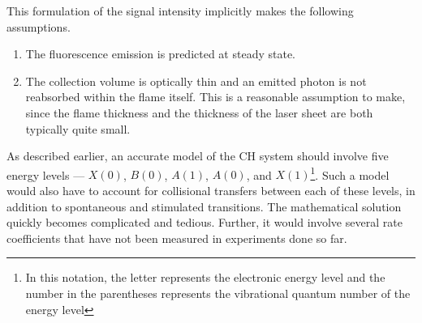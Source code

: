 This formulation of the signal intensity implicitly makes the following assumptions.
\begin{enumerate}
\item The fluorescence emission is predicted at steady state.
\item The collection volume is optically thin and an emitted photon is not reabsorbed within the flame itself.
This is a reasonable assumption to make, since the flame thickness and the thickness of the laser sheet are both typically quite small.
\end{enumerate}

As described earlier, an accurate model of the CH system should involve five energy levels --- \(X(0)\), \(B(0)\), \(A(1)\), \(A(0)\), and \(X(1)\)\footnote{In this notation, the letter represents the electronic energy level and the number in the parentheses represents the vibrational quantum number of the energy level}.
Such a model would also have to account for collisional transfers between each of these levels, in addition to spontaneous and stimulated transitions.
The mathematical solution quickly becomes complicated and tedious.
Further, it would involve several rate coefficients that have not been measured in experiments done so far.




%




